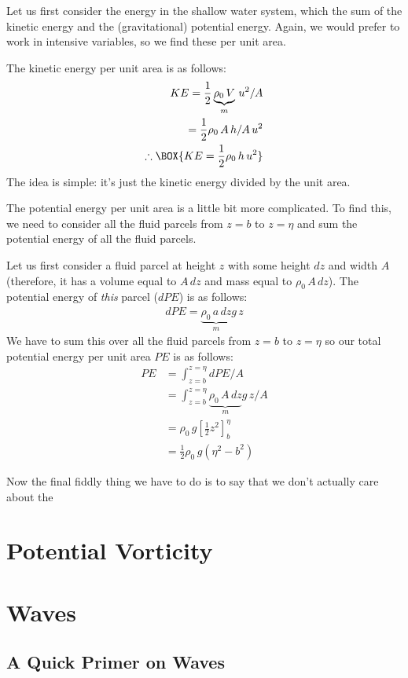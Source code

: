 Let us first consider the energy in the shallow water system, which the sum of the kinetic energy and the (gravitational) potential energy. Again, we would prefer to work in intensive variables, so we find these per unit area.

The kinetic energy per unit area is as follows:
\begin{align*}
    KE = \frac{1}{2}\underbrace{\rho_0\,V}_{m}\,u^2/A\\
    =\frac{1}{2}\rho_0\,A\,h/A\,u^2\\
    \therefore\BOX{KE = \frac{1}{2}\rho_0\,h\,u^2}
\end{align*}
The idea is simple: it's just the kinetic energy divided by the unit area.

The potential energy per unit area is a little bit more complicated. To find this, we need to consider all the fluid parcels from $z=b$ to $z=\eta$ and sum the potential energy of all the fluid parcels.

Let us first consider a fluid parcel at height $z$ with some height $dz$ and width $A$ (therefore, it has a volume equal to $A\,dz$ and mass equal to $\rho_0\,A\,dz$). The potential energy of \textit{this} parcel ($dPE$) is as follows:
\begin{align*}
    dPE=\underbrace{\rho_0\,a\,dz}_{m}g\,z
\end{align*}
We have to sum this over all the fluid parcels from $z=b$ to $z=\eta$ so our total potential energy per unit area $PE$ is as follows:
\begin{align*}
    PE &= \int_{z=b}^{z=\eta}dPE/A\\
    &= \int_{z=b}^{z=\eta}\underbrace{\rho_0\,A\,dz}_{m}g\,z/A\\
    &= \rho_0\,g\left[ \frac{1}{2}z^2 \right]_b^\eta\\
    &= \frac{1}{2}\rho_0\,g\left( \eta^2-b^2 \right)
\end{align*}

Now the final fiddly thing we have to do is to say that we don't actually care about the 

\section{Potential Vorticity}

\section{Waves}

\subsection{A Quick Primer on Waves}

